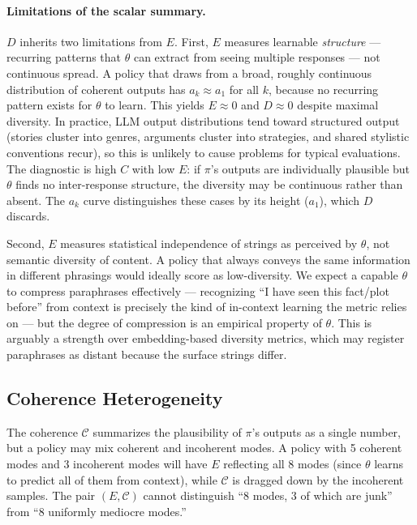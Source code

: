\documentclass[11pt]{article}
\begin{document}
\paragraph{Limitations of the scalar summary.} $D$ inherits two limitations from $E$. First, $E$ measures learnable \emph{structure} --- recurring patterns that $\theta$ can extract from seeing multiple responses --- not continuous spread. A policy that draws from a broad, roughly continuous distribution of coherent outputs has $a_k \approx a_1$ for all $k$, because no recurring pattern exists for $\theta$ to learn. This yields $E \approx 0$ and $D \approx 0$ despite maximal diversity. In practice, LLM output distributions tend toward structured output (stories cluster into genres, arguments cluster into strategies, and shared stylistic conventions recur), so this is unlikely to cause problems for typical evaluations. The diagnostic is high $C$ with low $E$: if $\pi$'s outputs are individually plausible but $\theta$ finds no inter-response structure, the diversity may be continuous rather than absent. The $a_k$ curve distinguishes these cases by its height ($a_1$), which $D$ discards.

Second, $E$ measures statistical independence of strings as perceived by $\theta$, not semantic diversity of content. A policy that always conveys the same information in different phrasings would ideally score as low-diversity. We expect a capable $\theta$ to compress paraphrases effectively --- recognizing ``I have seen this fact/plot before'' from context is precisely the kind of in-context learning the metric relies on --- but the degree of compression is an empirical property of $\theta$. This is arguably a strength over embedding-based diversity metrics, which may register paraphrases as distant because the surface strings differ.

\subsection{Coherence Heterogeneity}\label{sec:coherence-hetero}

The coherence $\mathcal{C}$ summarizes the plausibility of $\pi$'s outputs as a single number, but a policy may mix coherent and incoherent modes. A policy with 5 coherent modes and 3 incoherent modes will have $E$ reflecting all 8 modes (since $\theta$ learns to predict all of them from context), while $\mathcal{C}$ is dragged down by the incoherent samples. The pair $(E, \mathcal{C})$ cannot distinguish ``8 modes, 3 of which are junk'' from ``8 uniformly mediocre modes.''
\end{document}
